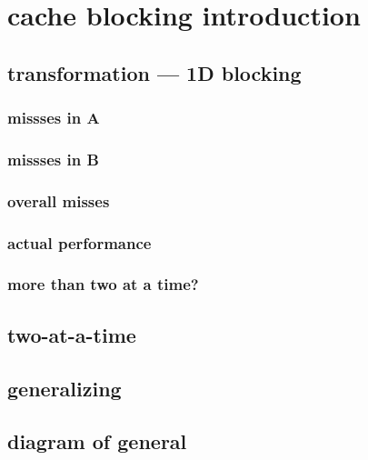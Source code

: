 \section{cache blocking introduction}
%
\subsection{transformation --- 1D blocking}

\subsubsection{missses in A}

\subsubsection{missses in B}

\subsubsection{overall misses}

\subsubsection{actual performance}

\subsubsection{more than two at a time?}

%

\subsection{two-at-a-time}

%

\subsection{generalizing}


\subsection{diagram of general}


